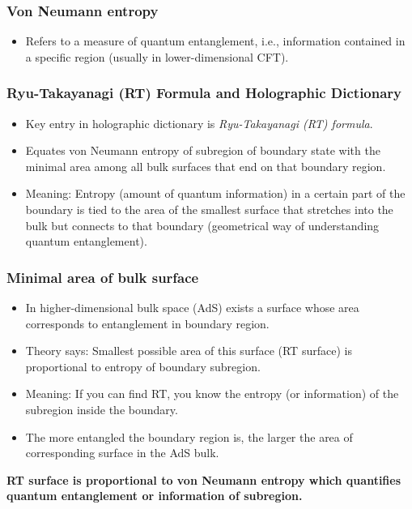 \documentclass[12pt]{article}
\begin{document}
\subsubsection*{Von Neumann entropy}
\begin{itemize}
    \item Refers to a measure of quantum entanglement, i.e., information contained in a specific region (usually in lower-dimensional CFT).
\end{itemize}

\subsubsection*{Ryu-Takayanagi (RT) Formula and Holographic Dictionary}
\begin{itemize}
    \item Key entry in holographic dictionary is \textit{Ryu-Takayanagi (RT) formula}.
    \item Equates von Neumann entropy of subregion of boundary state with the minimal area among all bulk surfaces that end on that boundary region.
    \item Meaning: Entropy (amount of quantum information) in a certain part of the boundary is tied to the area of the smallest surface that stretches into the bulk but connects to that boundary (geometrical way of understanding quantum entanglement).
\end{itemize}

\subsubsection*{Minimal area of bulk surface}
\begin{itemize}
    \item In higher-dimensional bulk space (AdS) exists a surface whose area corresponds to entanglement in boundary region.
    \item Theory says: Smallest possible area of this surface (RT surface) is proportional to entropy of boundary subregion.
    \item Meaning: If you can find RT, you know the entropy (or information) of the subregion inside the boundary.
    \item The more entangled the boundary region is, the larger the area of corresponding surface in the AdS bulk.
\end{itemize}

\textbf{RT surface is proportional to von Neumann entropy which quantifies quantum entanglement or information of subregion.}
\end{document}
